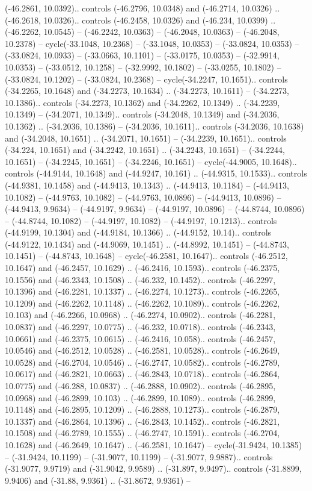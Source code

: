 \begin{scope}[shift={(2.5552, 9.9912)}]
\begin{scope}[shift={(48.1654, -14.8546)}]
(-46.2861, 10.0392).. controls (-46.2796, 10.0348) and (-46.2714, 10.0326) .. (-46.2618, 10.0326).. controls (-46.2458, 10.0326) and (-46.234, 10.0399) .. (-46.2262, 10.0545) -- (-46.2242, 10.0363) -- (-46.2048, 10.0363) -- (-46.2048, 10.2378) -- cycle(-33.1048, 10.2368) -- (-33.1048, 10.0353) -- (-33.0824, 10.0353) -- (-33.0824, 10.0933) -- (-33.0663, 10.1101) -- (-33.0175, 10.0353) -- (-32.9914, 10.0353) -- (-33.0512, 10.1258) -- (-32.9992, 10.1802) -- (-33.0255, 10.1802) -- (-33.0824, 10.1202) -- (-33.0824, 10.2368) -- cycle(-34.2247, 10.1651).. controls (-34.2265, 10.1648) and (-34.2273, 10.1634) .. (-34.2273, 10.1611) -- (-34.2273, 10.1386).. controls (-34.2273, 10.1362) and (-34.2262, 10.1349) .. (-34.2239, 10.1349) -- (-34.2071, 10.1349).. controls (-34.2048, 10.1349) and (-34.2036, 10.1362) .. (-34.2036, 10.1386) -- (-34.2036, 10.1611).. controls (-34.2036, 10.1638) and (-34.2048, 10.1651) .. (-34.2071, 10.1651) -- (-34.2239, 10.1651).. controls (-34.224, 10.1651) and (-34.2242, 10.1651) .. (-34.2243, 10.1651) -- (-34.2244, 10.1651) -- (-34.2245, 10.1651) -- (-34.2246, 10.1651) -- cycle(-44.9005, 10.1648).. controls (-44.9144, 10.1648) and (-44.9247, 10.161) .. (-44.9315, 10.1533).. controls (-44.9381, 10.1458) and (-44.9413, 10.1343) .. (-44.9413, 10.1184) -- (-44.9413, 10.1082) -- (-44.9763, 10.1082) -- (-44.9763, 10.0896) -- (-44.9413, 10.0896) -- (-44.9413, 9.9634) -- (-44.9197, 9.9634) -- (-44.9197, 10.0896) -- (-44.8744, 10.0896) -- (-44.8744, 10.1082) -- (-44.9197, 10.1082) -- (-44.9197, 10.1213).. controls (-44.9199, 10.1304) and (-44.9184, 10.1366) .. (-44.9152, 10.14).. controls (-44.9122, 10.1434) and (-44.9069, 10.1451) .. (-44.8992, 10.1451) -- (-44.8743, 10.1451) -- (-44.8743, 10.1648) -- cycle(-46.2581, 10.1647).. controls (-46.2512, 10.1647) and (-46.2457, 10.1629) .. (-46.2416, 10.1593).. controls (-46.2375, 10.1556) and (-46.2343, 10.1508) .. (-46.232, 10.1452).. controls (-46.2297, 10.1396) and (-46.2281, 10.1337) .. (-46.2274, 10.1273).. controls (-46.2265, 10.1209) and (-46.2262, 10.1148) .. (-46.2262, 10.1089).. controls (-46.2262, 10.103) and (-46.2266, 10.0968) .. (-46.2274, 10.0902).. controls (-46.2281, 10.0837) and (-46.2297, 10.0775) .. (-46.232, 10.0718).. controls (-46.2343, 10.0661) and (-46.2375, 10.0615) .. (-46.2416, 10.058).. controls (-46.2457, 10.0546) and (-46.2512, 10.0528) .. (-46.2581, 10.0528).. controls (-46.2649, 10.0528) and (-46.2704, 10.0546) .. (-46.2747, 10.0582).. controls (-46.2789, 10.0617) and (-46.2821, 10.0663) .. (-46.2843, 10.0718).. controls (-46.2864, 10.0775) and (-46.288, 10.0837) .. (-46.2888, 10.0902).. controls (-46.2895, 10.0968) and (-46.2899, 10.103) .. (-46.2899, 10.1089).. controls (-46.2899, 10.1148) and (-46.2895, 10.1209) .. (-46.2888, 10.1273).. controls (-46.2879, 10.1337) and (-46.2864, 10.1396) .. (-46.2843, 10.1452).. controls (-46.2821, 10.1508) and (-46.2789, 10.1555) .. (-46.2747, 10.1591).. controls (-46.2704, 10.1628) and (-46.2649, 10.1647) .. (-46.2581, 10.1647) -- cycle(-31.9424, 10.1385) -- (-31.9424, 10.1199) -- (-31.9077, 10.1199) -- (-31.9077, 9.9887).. controls (-31.9077, 9.9719) and (-31.9042, 9.9589) .. (-31.897, 9.9497).. controls (-31.8899, 9.9406) and (-31.88, 9.9361) .. (-31.8672, 9.9361) -- 
\end{scope}
\end{scope}

